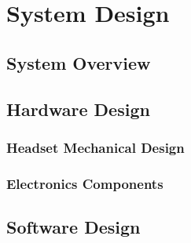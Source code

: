 \chapter{System Design}
\label{chapter:design}




\section{System Overview}



\section{Hardware Design}


\subsection{Headset Mechanical Design}



\subsection{Electronics Components}





\section{Software Design}

